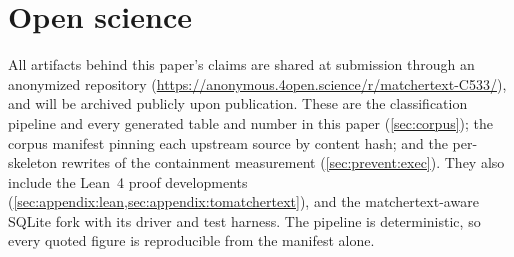 \section{Open science}
\label{sec:appendix:openscience}

All artifacts behind this paper's claims are shared at submission through an
anonymized repository (\url{https://anonymous.4open.science/r/matchertext-C533/}), and will be archived publicly
upon publication.
These are the classification pipeline and every generated table and number in
this paper (\cref{sec:corpus}); the corpus manifest pinning each upstream source
by content hash; and the per-skeleton rewrites of the containment measurement
(\cref{sec:prevent:exec}).
They also include the Lean~4 proof developments
(\cref{sec:appendix:lean,sec:appendix:tomatchertext}), and the matchertext-aware
SQLite fork with its driver and test harness.
The pipeline is deterministic, so every quoted figure is reproducible from the
manifest alone.
